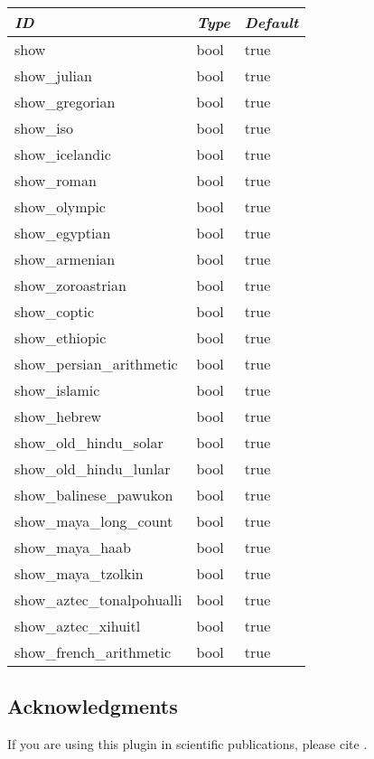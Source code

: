 \begin{longtable}{l|l|l}\toprule
\emph{ID}                      &\emph{Type} & \emph{Default}  \\\midrule
show                         &bool & true\\\midrule
show\_julian                 &bool & true\\
show\_gregorian              &bool & true\\
show\_iso                    &bool & true\\
show\_icelandic              &bool & true\\\midrule
show\_roman                  &bool & true\\
show\_olympic                &bool & true\\
show\_egyptian               &bool & true\\
show\_armenian               &bool & true\\
show\_zoroastrian            &bool & true\\
show\_coptic                 &bool & true\\
show\_ethiopic               &bool & true\\
show\_persian\_arithmetic    &bool & true\\\midrule
show\_islamic                &bool & true\\
show\_hebrew                 &bool & true\\\midrule
show\_old\_hindu\_solar      &bool & true\\
show\_old\_hindu\_lunlar     &bool & true\\
show\_balinese\_pawukon      &bool & true\\\midrule
show\_maya\_long\_count      &bool & true\\
show\_maya\_haab             &bool & true\\
show\_maya\_tzolkin          &bool & true\\
show\_aztec\_tonalpohualli   &bool & true\\
show\_aztec\_xihuitl         &bool & true\\\midrule
show\_french\_arithmetic     &bool & true\\\bottomrule
\end{longtable}

\subsection{Acknowledgments}

If you are using this plugin in scientific publications, please cite \citet{Zotti-etal:JSA2020.6.2}.



